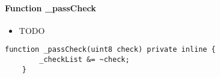 \paragraph{Function \_{}passCheck}

\begin{itemize}
\item TODO
\end{itemize}

\begin{lstlisting}[firstnumber=58]
    function _passCheck(uint8 check) private inline {
        _checkList &= ~check;
    }
\end{lstlisting}
